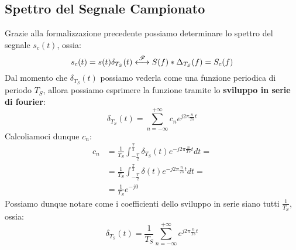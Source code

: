 \subsection{Spettro del Segnale Campionato}
Grazie alla formalizzazione precedente possiamo determinare lo spettro del segnale $s_c(t)$, ossia:
\begin{equation}
    s_c(t) = s(t)\delta_{T_S}(t) \overset{{\mathscr{F}}}{\longleftrightarrow} S(f)\ast\Delta_{T_S}(f) = S_c(f)
\end{equation}
Dal momento che $\delta_{T_S}(t)$ possiamo vederla come una funzione periodica di periodo $T_S$, allora possiamo esprimere
la funzione tramite lo \textbf{sviluppo in serie di fourier}:
\begin{equation}
    \delta_{T_S}(t) = \sum_{n = -\infty}^{+\infty} c_n e^{j2\pi\frac{n}{Ts}t}
\end{equation}
Calcoliamoci dunque $c_n$:
\begin{align*}
    c_n &= \frac{1}{T_S}\int_{-\frac{T}{2}}^{\frac{T}{2}} \delta_{T_S}(t)e^{-j2\pi \frac{n}{Ts}t}dt=\\
        &= \frac{1}{T_S}\int_{-\frac{T}{2}}^{\frac{T}{2}} \delta(t)e^{-j2\pi \frac{n}{Ts}t}dt=\\
        &= \frac{1}{T_S}e^{-j0} \tag{per il campionamento}
\end{align*}
Possiamo dunque notare come i coefficienti dello sviluppo in serie siano tutti $\frac{1}{T_S}$, ossia:
\begin{equation}
    \delta_{T_S}(t) = \frac{1}{T_S}\sum_{n = -\infty}^{+\infty} e^{j2\pi\frac{n}{Ts}t}
\end{equation}